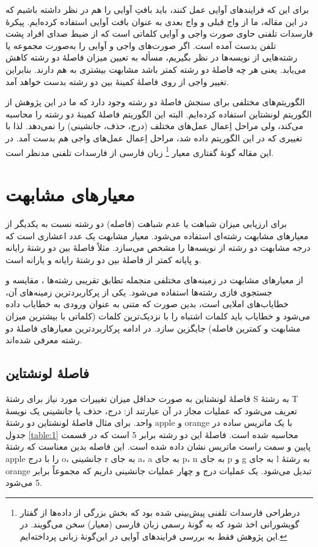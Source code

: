 \documentclass[12pt,onecolumn,a4paper]{article}
\begin{document}
    برای این که فرایندهای آوایی عمل کنند، باید بافتِ آوایی را هم در نظر داشته باشیم که در این مقاله، ما از واج قبلی و واج بعدی به عنوان بافت آوایی استفاده کرده‌ایم. پیکرهٔ فارسدات تلفنی حاوی صورت واجی و آوایی کلماتی است که از ضبط صدای افراد پشت تلفن بدست آمده است. اگر صورت‌های واجی و آوایی را به‌صورت مجموعه یا رشته‌هایی از نویسه‌ها در نظر بگیریم، مسأله به تعیین میزان فاصلۀ دو رشته کاهش می‌یابد. یعنی هر چه فاصلۀ دو رشته کمتر باشد مشابهت بیشتری به هم دارند. بنابراین تغییر واجی از روی فاصلۀ کمینۀ بین دو رشته بدست خواهد آمد.
    \par
    الگوریتم‌های مختلفی برای سنجش فاصلۀ دو رشته وجود دارد که ما در این پژوهش از الگوریتم لونشتاین  استفاده کرده‌ایم. البته این الگوریتم فاصلۀ کمینۀ دو رشته را محاسبه می‌کند، ولی مراحل اِعمال عمل‌های مختلف (درج، حذف، جانشینی) را نمی‌دهد. لذا با تغییری که در این الگوریتم داده شد، مراحل اِعمال عمل‌های واجی هم بدست آمد.
    در این مقاله گونهٔ گفتاری معیار
    \footnote{درطراحی فارسدات تلفنی پیش‌بینی شده بود که بخش بزرگی از داده‌ها از گفتار گویشورانی اخذ شود که به گونهٔ رسمی زبان فارسی (معیار) سخن می‌گویند. در این پژوهش فقط به بررسی فرایندهای آوایی در این‌گونهٔ زبانی پرداخته‌ایم.}
    زبان فارسی از فارسدات تلفنی مدنظر است.

    \section{معیارهای مشابهت}
    برای ارزیابی میزان شباهت یا عدم شباهت (فاصله) دو رشته نسبت به یکدیگر از معیارهای مشابهت رشته‌ای استفاده می‌شود. معیار مشابهت یک عدد اعشاری است که درجه مشابهت دو رشته از نویسه‌ها را مشخص می‌سازد. مثلاً فاصلۀ بین دو رشتۀ رایانه و پایانه کمتر از فاصلۀ بین دو رشتۀ رایانه و یارانه است.
    \par
    از معیارهای مشابهت در زمینه‌های مختلفی منجمله تطابق تقریبی رشته‌ها ، مقایسه  و جستجوی فازی رشته‌ها  استفاده می‌شود. یکی از پرکاربردترین زمینه‌های آن، خطایاب‌های املایی  است، بدین صورت که متنی به عنوان ورودی به خطایاب داده می‌شود و خطایاب باید کلمات اشتباه را با نزدیک‌ترین کلمات (کلماتی با بیشترین میزان مشابهت و کمترین فاصله) جایگزین سازد. در ادامه پرکاربردترین معیارهای فاصلۀ دو رشته معرفی شده‌اند.

    \subsection{فاصلۀ لونشتاین\protect{}}
    فاصلۀ لونشتاین  به صورت حداقل میزان تغییرات مورد نیاز برای رشتۀ S به رشتۀ T تعریف می‌شود که عملیات مجاز در آن عبارتند از: درج، حذف یا جانشینی یک نویسۀ واحد. برای مثال فاصلۀ لونشتاین دو رشتۀ apple و orange با یک ماتریس ساده در جدول \ref{table:1} محاسبه شده است. فاصلۀ این دو رشته برابر 5 است که در قسمت پایین و سمت راست ماتریس نشان داده شده است. این فاصله بدین معناست که رشتۀ apple را با درج o، جانشینی r به جای a، a به جای p، n به جای p و g به جای l به رشتۀ orange تبدیل می‌شود. یک عملیات درج و چهار عملیات جانشینی داریم که مجموعاً برابر 5 می‌شود.
\end{document}

